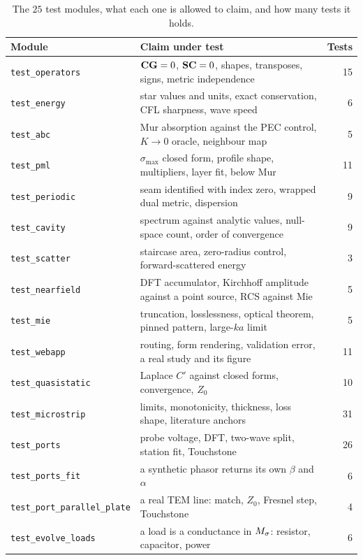 \begin{table}[H]
  \centering
  \caption{The $25$ test modules, what each one is allowed to claim, and how many tests it holds.}
  \label{tab:tests}
  \begin{tabular}{@{}l p{8.8cm} r@{}}
    \toprule
    Module & Claim under test & Tests \\
    \midrule
    \texttt{test\_operators} & $\mathbf{C}\mathbf{G}=0$, $\mathbf{S}\mathbf{C}=0$, shapes, transposes, signs, metric independence & 15 \\
    \texttt{test\_energy}    & star values and units, exact conservation, CFL sharpness, wave speed & 6 \\
    \texttt{test\_abc}       & Mur absorption against the PEC control, $K\to0$ oracle, neighbour map & 5 \\
    \texttt{test\_pml}       & $\sigma_{\max}$ closed form, profile shape, multipliers, layer fit, below Mur & 11 \\
    \texttt{test\_periodic}  & seam identified with index zero, wrapped dual metric, dispersion & 9 \\
    \texttt{test\_cavity}    & spectrum against analytic values, null-space count, order of convergence & 9 \\
    \texttt{test\_scatter}   & staircase area, zero-radius control, forward-scattered energy & 3 \\
    \texttt{test\_nearfield} & DFT accumulator, Kirchhoff amplitude against a point source, RCS against Mie & 5 \\
    \texttt{test\_mie}       & truncation, losslessness, optical theorem, pinned pattern, large-$ka$ limit & 5 \\
    \texttt{test\_webapp}    & routing, form rendering, validation error, a real study and its figure & 11 \\
    \texttt{test\_quasistatic} & Laplace $C'$ against closed forms, convergence, $Z_0$ & 10 \\
    \texttt{test\_microstrip} & limits, monotonicity, thickness, loss shape, literature anchors & 31 \\
    \texttt{test\_ports}     & probe voltage, DFT, two-wave split, station fit, Touchstone & 26 \\
    \texttt{test\_ports\_fit} & a synthetic phasor returns its own $\beta$ and $\alpha$ & 6 \\
    \texttt{test\_port\_parallel\_plate} & a real TEM line: match, $Z_0$, Fresnel step, Touchstone & 4 \\
    \texttt{test\_evolve\_loads} & a load is a conductance in ${M_{\sigma}}$: resistor, capacitor, power & 6 \\

\end{tabular}
\end{table}

